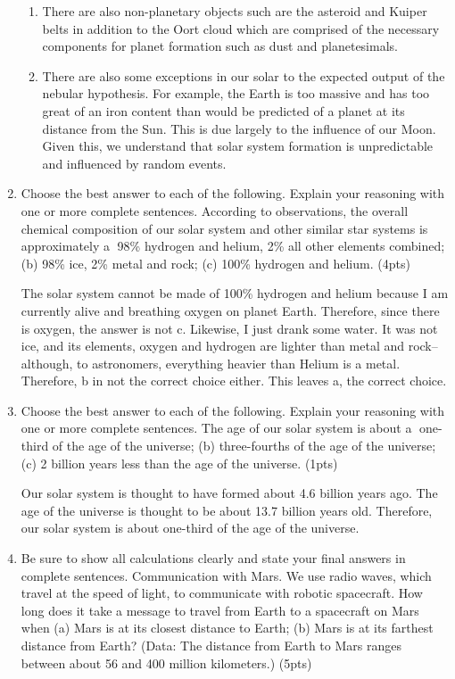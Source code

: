 \documentclass{article}
\begin{document}
\begin{enumerate}[start=15]
\begin{enumerate}
        \item There are also non-planetary objects such are the asteroid and Kuiper belts in addition to the Oort cloud which are comprised of the necessary components for planet formation such as dust and planetesimals.
        
        \item There are also some exceptions in our solar to the expected output of the nebular hypothesis. For example, the Earth is too massive and has too great of an iron content than would be predicted of a planet at its distance from the Sun. This is due largely to the influence of our Moon. Given this, we understand that solar system formation is unpredictable and influenced by random events.
    \end{enumerate}
    
    
    \item Choose the best answer to each of the following. Explain your reasoning with one or more complete sentences. According to observations, the overall chemical composition of our solar system and other similar star systems is approximately 
    \textcircled{a} 98\% hydrogen and helium, 2\% all other elements combined; 
    (b) 98\% ice, 2\% metal and rock; 
    (c) 100\% hydrogen and helium. (4pts)

    The solar system cannot be made of 100\% hydrogen and helium because I am currently alive and breathing oxygen on planet Earth. Therefore, since there is oxygen, the answer is not c.
    Likewise, I just drank some water. It was not ice, and its elements, oxygen and hydrogen are lighter than metal and rock--although, to astronomers, everything heavier than Helium is a metal. Therefore, b in not the correct choice either. 
    This leaves a, the correct choice.

    \item Choose the best answer to each of the following. Explain your reasoning with one or more complete sentences.
    The age of our solar system is about 
    \textcircled{a} one-third of the age of the universe; 
    (b) three-fourths of the age of the universe; 
    (c) 2 billion years less than the age of the universe. (1pts)

    Our solar system is thought to have formed about 4.6 billion years ago. The age of the universe is thought to be about 13.7 billion years old. Therefore, our solar system is about one-third of the age of the universe.
    
    \item Be sure to show all calculations clearly and state your final answers in complete sentences. Communication with Mars. 
    We use radio waves, which travel at the speed of light, to communicate with robotic spacecraft. 
    How long does it take a message to travel from Earth to a spacecraft on Mars when 
    (a) Mars is at its closest distance to Earth; 
    (b) Mars is at its farthest distance from Earth? 
    (Data: The distance from Earth to Mars ranges between about 56 and 400 million kilometers.) (5pts)


\end{enumerate}
\end{document}
